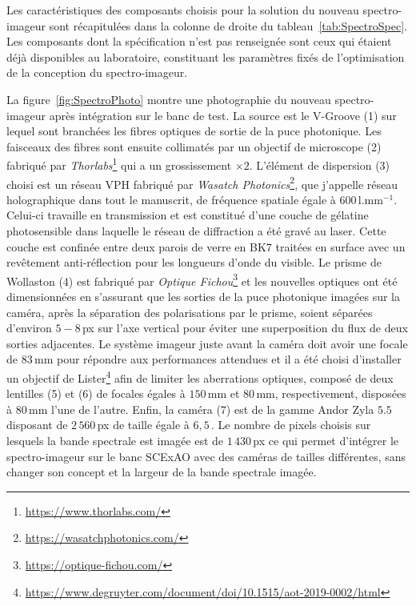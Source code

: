 Les caractéristiques des composants choisis pour la solution du nouveau spectro-imageur sont récapitulées dans la colonne de droite du tableau~\ref{tab:SpectroSpec}. Les composants dont la spécification n'est pas renseignée sont ceux qui étaient déjà disponibles au laboratoire, constituant les paramètres fixés de l'optimisation de la conception du spectro-imageur.

La figure~\ref{fig:SpectroPhoto} montre une photographie du nouveau spectro-imageur après intégration sur le banc de test. La source est le V-Groove (1) sur lequel sont branchées les fibres optiques de sortie de la puce photonique. Les faisceaux des fibres sont ensuite collimatés par un objectif de microscope (2) fabriqué par \textit{Thorlabs}\footnote{\url{https://www.thorlabs.com/}} qui a un grossissement $\times 2$. L'élément de dispersion (3) choisi est un réseau \ac{VPH} fabriqué par \textit{Wasatch Photonics}\footnote{\url{https://wasatchphotonics.com/}}, que j'appelle réseau holographique dans tout le manuscrit, de fréquence spatiale égale à $600 \,\text{l}.\text{mm}^{-1}$. Celui-ci travaille en transmission et est constitué d'une couche de gélatine photosensible dans laquelle le réseau de diffraction a été gravé au laser. Cette couche est confinée entre deux parois de verre en BK7 traitées en surface avec un revêtement anti-réflection pour les longueurs d'onde du visible. Le prisme de Wollaston (4) est fabriqué par \textit{Optique Fichou}\footnote{\url{https://optique-fichou.com/}} et les nouvelles optiques ont été dimensionnées en s'assurant que les sorties de la puce photonique imagées sur la caméra, après la séparation des polarisations par le prisme, soient séparées d'environ $5 - 8 \,$px sur l'axe vertical pour éviter une superposition du flux de deux sorties adjacentes. Le système imageur juste avant la caméra doit avoir une focale de $83 \,$mm pour répondre aux performances attendues et il a été choisi d'installer un objectif de Lister\footnote{\url{https://www.degruyter.com/document/doi/10.1515/aot-2019-0002/html}} afin de limiter les aberrations optiques, composé de deux lentilles (5) et (6) de focales égales à $150 \,$mm et $80 \,$mm, respectivement, disposées à $80 \,$mm l'une de l'autre. Enfin, la caméra (7) est de la gamme Andor Zyla $5.5$ disposant de $2\,560 \,$px de taille égale à $6,5 \,$\um. Le nombre de pixels choisis sur lesquels la bande spectrale est imagée est de $1\,430 \,$px ce qui permet d'intégrer le spectro-imageur sur le banc \ac{SCExAO} avec des caméras de tailles différentes, sans changer son concept et la largeur de la bande spectrale imagée.

